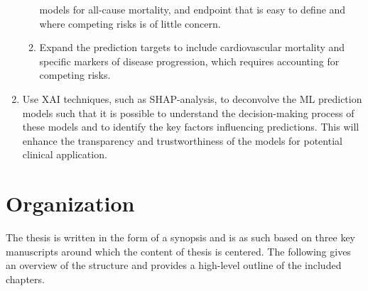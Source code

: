 \begin{enumerate}
\begin{enumerate}
            models for all-cause mortality, and endpoint that is easy to 
            define and where competing risks is of little concern.
        \item Expand the prediction targets to include cardiovascular
            mortality and specific markers of disease progression, 
            which requires accounting for competing risks.
    \end{enumerate}
    \item Use \ac{XAI} techniques, such as \ac{SHAP}-analysis, to deconvolve 
        the \ac{ML} prediction models such that it is possible to understand 
        the decision-making process of these models and to identify the key 
        factors influencing predictions. This will enhance the
        transparency and trustworthiness of the models for potential clinical 
        application.
\end{enumerate}

\section*{Organization}

The thesis is written in the form of a synopsis 
and is as such based on three key manuscripts around 
which the content of thesis is centered.
The following gives an overview of the structure and 
provides a high-level outline of the included chapters.

